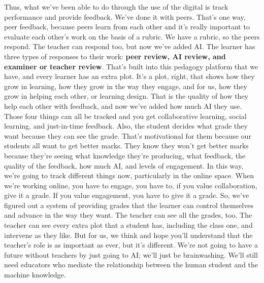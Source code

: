 \documentclass[english]{textolivre}
\begin{document}
{    Thus, what we’ve been able to do through the use of the digital is track performance and provide feedback. We’ve done it with peers. That’s one way, peer feedback, because peers learn from each other and it’s really important to evaluate each other’s work on the basis of a rubric. We have a rubric, so the peers respond. The teacher can respond too, but now we’ve added AI. The learner has three types of responses to their work: \textbf{peer review, AI review, and examiner or teacher review}. That’s built into this pedagogy platform that we have, and every learner has an extra plot. It’s a plot, right, that shows how they grow in learning, how they grow in the way they engage, and for us, how they grow in helping each other, or learning design. That is the quality of how they help each other with feedback, and now we’ve added how much AI they use. Those four things can all be tracked and you get collaborative learning, social learning, and just-in-time feedback. Also, the student decides what grade they want because they can see the grade. That’s motivational for them because our students all want to get better marks. They know they won’t get better marks because they’re seeing what knowledge they’re producing, what feedback, the quality of the feedback, how much AI, and levels of engagement. In this way, we’re going to track different things now, particularly in the online space. When we’re working online, you have to engage, you have to, if you value collaboration, give it a grade. If you value engagement, you have to give it a grade. So, we’ve figured out a system of providing grades that the learner can control themselves and advance in the way they want. The teacher can see all the grades, too. The teacher can see every extra plot that a student has, including the class one, and intervene as they like. But for us, we think and hope you’ll understand that the teacher’s role is as important as ever, but it’s different. We’re not going to have a future without teachers by just going to AI; we’ll just be brainwashing. We’ll still need educators who mediate the relationship between the human student and the machine knowledge.\\
}
\end{document}
